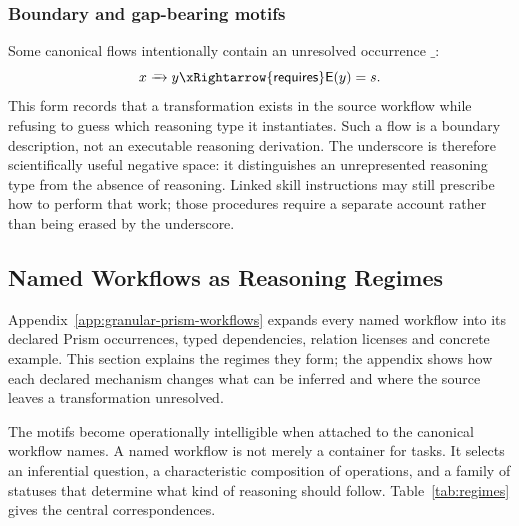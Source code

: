 \subsubsection{Boundary and gap-bearing motifs}

Some canonical flows intentionally contain an unresolved occurrence
$\mathsf{\_}$:
\[
  x\xrightarrow{\mathsf{\_}}y
  \xRightarrow{\mathsf{requires}}\mathsf{E}(y)=s.
\]
This form records that a transformation exists in the source workflow while
refusing to guess which reasoning type it instantiates. Such a flow is a
boundary description, not an executable reasoning derivation. The underscore
is therefore scientifically useful negative space: it distinguishes an
unrepresented reasoning type from the absence of reasoning. Linked skill
instructions may still prescribe how to perform that work; those procedures
require a separate account rather than being erased by the underscore.

\subsection{Named Workflows as Reasoning Regimes}

Appendix~\ref{app:granular-prism-workflows} expands every named workflow into its declared Prism occurrences, typed dependencies, relation licenses and concrete example. This section explains the regimes they form; the appendix shows how each declared mechanism changes what can be inferred and where the source leaves a transformation unresolved.

The motifs become operationally intelligible when attached to the canonical
workflow names. A named workflow is not merely a container for tasks. It
selects an inferential question, a characteristic composition of operations,
and a family of statuses that determine what kind of reasoning should follow.
Table~\ref{tab:regimes} gives the central correspondences.


